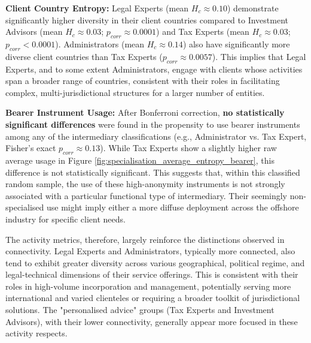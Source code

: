\textbf{Client Country Entropy:}
Legal Experts (mean $H_c \approx 0.10$) demonstrate significantly higher diversity in their client countries compared to Investment Advisors (mean $H_c \approx 0.03$; $p_{corr} \approx 0.0001$) and Tax Experts (mean $H_c \approx 0.03$; $p_{corr} < 0.0001$). Administrators (mean $H_c \approx 0.14$) also have significantly more diverse client countries than Tax Experts ($p_{corr} \approx 0.0057$). This implies that Legal Experts, and to some extent Administrators, engage with clients whose activities span a broader range of countries, consistent with their roles in facilitating complex, multi-jurisdictional structures for a larger number of entities.

\textbf{Bearer Instrument Usage:}
After Bonferroni correction, \textbf{no statistically significant differences} were found in the propensity to use bearer instruments among any of the intermediary classifications (e.g., Administrator vs. Tax Expert, Fisher's exact $p_{corr} \approx 0.13$). While Tax Experts show a slightly higher raw average usage in Figure \ref{fig:specialisation_average_entropy_bearer}, this difference is not statistically significant. This suggests that, within this classified random sample, the use of these high-anonymity instruments is not strongly associated with a particular functional type of intermediary. Their seemingly non-specialised use might imply either a more diffuse deployment across the offshore industry for specific client needs.

The activity metrics, therefore, largely reinforce the distinctions observed in connectivity. Legal Experts and Administrators, typically more connected, also tend to exhibit greater diversity across various geographical, political regime, and legal-technical dimensions of their service offerings. This is consistent with their roles in high-volume incorporation and management, potentially serving more international and varied clienteles or requiring a broader toolkit of jurisdictional solutions. The "personalised advice" groups (Tax Experts and Investment Advisors), with their lower connectivity, generally appear more focused in these activity respects. 

